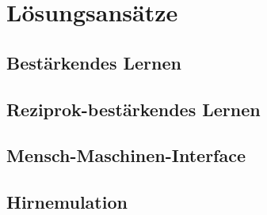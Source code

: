 \chapter{Lösungsansätze}
\section{Bestärkendes Lernen}
\section{Reziprok-bestärkendes Lernen}
\section{Mensch-Maschinen-Interface}
\section{Hirnemulation}
